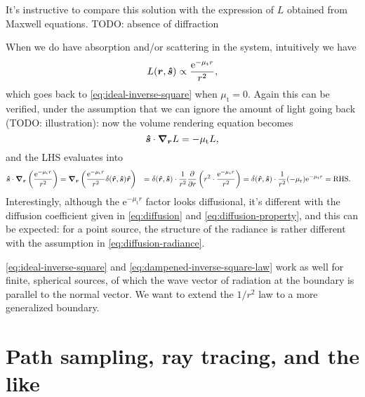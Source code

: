 \documentclass[hyperref, a4paper]{article}
\newcommand*{\ee}{\mathrm{e}}
\def\\{}%
\begin{document}
It's instructive to compare this solution with 
the expression of $L$ obtained from Maxwell equations.
TODO: absence of diffraction

When we do have absorption and/or scattering in the system, 
intuitively we have 
\begin{equation}
    L(\vb*{r}, \vu*{s}) \propto \frac{\ee^{- \mu_{\text{t}} r}}{r^2},
    \label{eq:dampened-inverse-square-law}
\end{equation}
which goes back to \eqref{eq:ideal-inverse-square}
when $\mu_{\text{t}} = 0$.
Again this can be verified, under the assumption that 
we can ignore the amount of light going back (TODO: illustration):
now the volume rendering equation becomes 
\begin{equation}
    \vu*{s} \cdot \grad_{\vb*{r}} L = - \mu_{\text{t}} L,
\end{equation}
and the LHS evaluates into 
\begin{equation}
    \begin{aligned}
        \vu*{s} \cdot \grad_{\vb*{r}} \left(
            \frac{\ee^{- \mu_{\text{t}} r}}{r^2}
        \right) &= 
        \grad_{\vb*{r}} \left(
            \frac{\ee^{- \mu_{\text{t}} r}}{r^2} 
            \delta(\vu*{r}, \vu*{s}) \vu*{r}
        \right)  \\
        &= \delta(\vu*{r}, \vu*{s}) \cdot \frac{1}{r^2} \pdv{r} \left(
            r^2 \cdot \frac{\ee^{- \mu_{\text{t}} r}}{r^2} 
        \right) \\
        &= \delta(\vu*{r}, \vu*{s}) \cdot \frac{1}{r^2} 
        (- \mu_{\text{r}}) \ee^{- \mu_{\text{t}} r} = \text{RHS}.
    \end{aligned}
\end{equation}
Interestingly, although the $\ee^{- \mu_{\text{t}} r}$ factor 
looks diffusional, 
it's different with the diffusion coefficient given in 
\eqref{eq:diffusion} and \eqref{eq:diffusion-property},
and this can be expected: for a point source, 
the structure of the radiance is rather different with 
the assumption in \eqref{eq:diffusion-radiance}.

\eqref{eq:ideal-inverse-square} and \eqref{eq:dampened-inverse-square-law}
work as well for finite, spherical sources,
of which the wave vector of radiation at the boundary 
is parallel to the normal vector.
We want to extend the $1/r^2$ law to a more generalized boundary.


\section{Path sampling, ray tracing, and the like}
\end{document}
